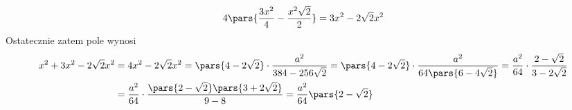 \begin{equation*}
    4\pars{\frac{3x^2}{4} - \frac{x^2\sqrt{2}}{2}}
        = 3x^2 - 2\sqrt{2}x^2
\end{equation*}
Ostatecznie zatem pole wynosi
\begin{equation*}
    \begin{split}
        x^2 + 3x^2 - 2\sqrt{2}x^2
            &= 4x^2 - 2\sqrt{2}x^2
            = \pars{4 - 2\sqrt{2}} \cdot \frac{a^2}{384 - 256\sqrt{2}}
            = \pars{4 - 2\sqrt{2}} \cdot \frac{a^2}{64\pars{6 - 4\sqrt{2}}}
            = \frac{a^2}{64} \cdot \frac{2 - \sqrt{2}}{3 - 2\sqrt{2}}\\
            &= \frac{a^2}{64} \cdot \frac{\pars{2 - \sqrt{2}}\pars{3 + 2\sqrt{2}}}{9 - 8}
            = \frac{a^2}{64}\pars{2 - \sqrt{2}}
    \end{split}
\end{equation*}
